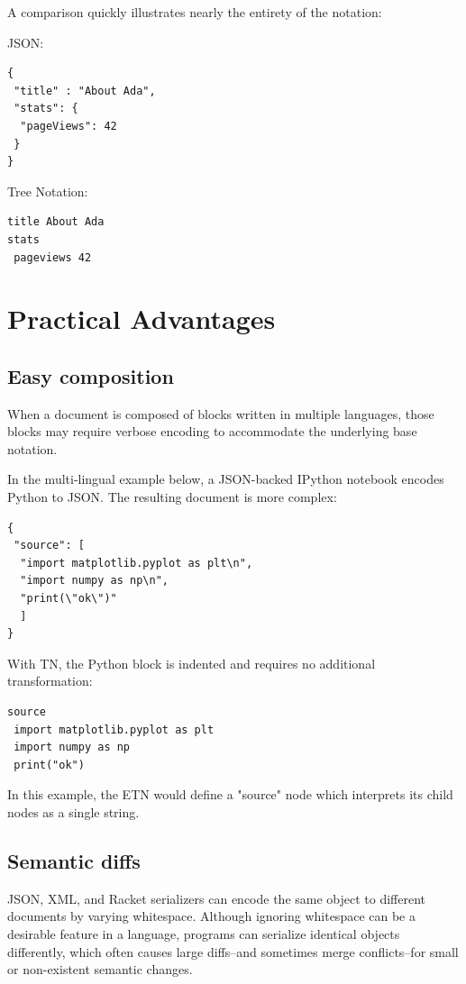 \documentclass[journal]{IEEEtran}
\begin{document}
A comparison quickly illustrates nearly the entirety of the notation:

JSON:

\begin{lstlisting}
{
 "title" : "About Ada",
 "stats": {
  "pageViews": 42
 }
}
\end{lstlisting}

Tree Notation:

\begin{lstlisting}
title About Ada
stats
 pageviews 42
\end{lstlisting}

\section{Practical Advantages}

\subsection{Easy composition}

When a document is composed of blocks written in multiple languages, those blocks may require verbose encoding to accommodate the underlying base notation.

In the multi-lingual example below, a JSON-backed IPython notebook encodes Python to JSON. The resulting document is more complex:

\begin{lstlisting}
{
 "source": [
  "import matplotlib.pyplot as plt\n",
  "import numpy as np\n",
  "print(\"ok\")"
  ]
}
\end{lstlisting}

With TN, the Python block is indented and requires no additional transformation:

\begin{lstlisting}
source
 import matplotlib.pyplot as plt
 import numpy as np
 print("ok")
\end{lstlisting}

In this example, the ETN would define a "source" node which interprets its child nodes as a single string.

\subsection{Semantic diffs}

JSON, XML, and Racket serializers can encode the same object to different documents by varying whitespace. Although ignoring whitespace can be a desirable feature in a language, programs can serialize identical objects differently, which often causes large diffs--and sometimes merge conflicts--for small or non-existent semantic changes.
\end{document}
